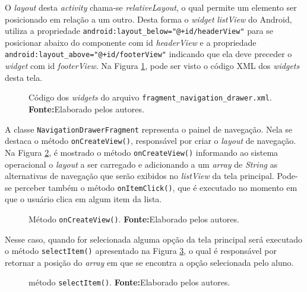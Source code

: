 	\par O \textit{layout} desta \textit{activity} chama-se
\textit{relativeLayout}, o qual permite um elemento ser posicionado em relação
a um outro. Desta forma o \textit{widget} \textit{listView} do Android, utiliza
a propriedade \texttt{android:layout\_below="@+id/headerView"} para se posicionar abaixo do
componente com id \textit{headerView} e a propriedade
\texttt{android:layout\_above="@+id/footerView"} indicando que ela deve preceder
o \textit{widget} com id \textit{footerView}. Na Figura \ref{fig:app2}, pode
ser visto o código XML dos \textit{widgets} desta tela.

	\begin{figure}[h!] 
		
		\caption[Código dos widgets do arquivo
		fragment\_navigation\_drawer.xml]{Código dos \textit{widgets} do arquivo
		\texttt{fragment\_navigation\_drawer.xml}.
		\textbf{Fonte:}Elaborado pelos autores.}
		\label{fig:app2}
	\end{figure}
	
	\pagebreak
	
	\par A classe \texttt{NavigationDrawerFragment} representa o painel de
navegação. Nela se destaca o método \texttt{onCreateView()}, responsável por
criar o \textit{layout} de navegação. Na Figura \ref{fig:app3}, é mostrado o
método \texttt{onCreateView()} informando ao sistema operacional o \textit{layout} a
ser carregado e adicionando a um \textit{array} de \textit{String} as
alternativas de navegação que serão exibidos no \textit{listView} da tela
principal. Pode-se perceber também o método \texttt{onItemClick()}, que é
executado no momento em que o usuário clica em algum item da lista. 
	


	\begin{figure}[h!] 
		
		\caption[Método onCreateView()]{Método \texttt{onCreateView()}.
		\textbf{Fonte:}Elaborado pelos autores.}
		\label{fig:app3}
	\end{figure}
	
	\pagebreak
	
	\par Nesse caso, quando for selecionada alguma opção da tela principal será
executado o método \texttt{selectItem()} apresentado na Figura \ref{fig:app4}, o
qual é responsável por retornar a posição do \textit{array} em que se encontra a
opção selecionada pelo aluno.
	
	\begin{figure}[h!] 
		
		\caption[método selectItem()]{método \texttt{selectItem()}.
		\textbf{Fonte:}Elaborado pelos autores.}
		\label{fig:app4}
	\end{figure}
	
